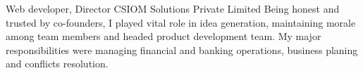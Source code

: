     {Web developer, Director}
    {}
    {CSIOM Solutions Private Limited}
    {}
    {Being honest and trusted by co-founders, I played vital role in idea generation, maintaining morale among team members and headed product development team. My major responsibilities were managing financial and banking operations, business planing and conflicts resolution.
    }
    \vspace*{0.2\baselineskip}
